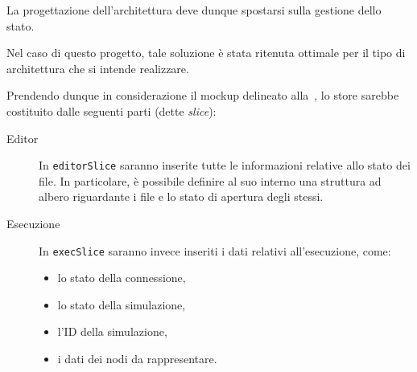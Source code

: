       La progettazione dell'architettura deve dunque spostarsi sulla gestione dello stato.







    
      Nel caso di questo progetto, tale soluzione è stata ritenuta ottimale per il tipo di architettura che si intende realizzare.

      Prendendo dunque in considerazione il mockup delineato alla~, lo store sarebbe costituito dalle seguenti parti (dette \emph{slice}):

      \begin{description}
        \item[Editor]
          In \texttt{editorSlice} saranno inserite tutte le informazioni relative allo stato dei file.
          In particolare, è possibile definire al suo interno una struttura ad albero riguardante i file e lo stato di apertura degli stessi.
        \item[Esecuzione]
          In \texttt{execSlice} saranno invece inseriti i dati relativi all'esecuzione, come:
          \begin{itemize}
            \item lo stato della connessione,
            \item lo stato della simulazione,
            \item l'ID della simulazione,
            \item i dati dei nodi da rappresentare.
          \end{itemize}
      \end{description}

